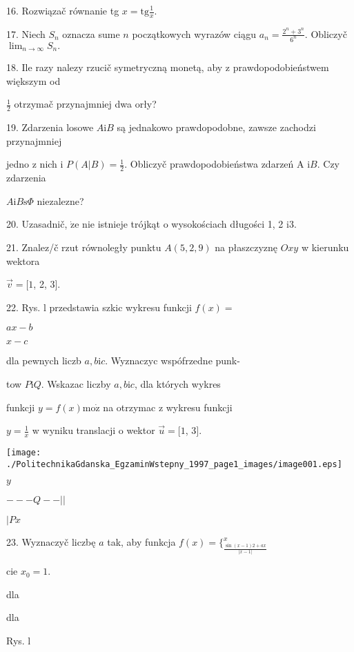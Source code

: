 \documentclass[a4paper,12pt]{article}
\begin{document}
16. Rozwiązač równanie tg $x=\displaystyle \mathrm{t}\mathrm{g}\frac{1}{x}.$

17. Niech $S_{n}$ oznacza sume $n$ początkowych wyrazów ciągu $a_{n}=\displaystyle \frac{2^{n}+3^{n}}{6^{n}}.$ Obliczyč $\displaystyle \lim_{n\rightarrow\infty}S_{n}.$




18. Ile razy nalezy rzucič symetryczną monetą, aby z prawdopodobieństwem większym od

$\displaystyle \frac{1}{2}$ otrzymač przynajmniej dwa orły?

19. Zdarzenia losowe $A\mathrm{i}B$ są jednakowo prawdopodobne, zawsze zachodzi przynajmniej

jedno z nich i $P(A|B)=\displaystyle \frac{1}{2}$. Obliczyč prawdopodobieństwa zdarzeń A $\mathrm{i}B$. Czy zdarzenia

$ A\mathrm{i}B\mathrm{s}\Phi$ niezalezne?

20. Uzasadnič, $\dot{\mathrm{z}}\mathrm{e}$ nie istnieje trójkąt o wysokościach długości 1, 2 $\mathrm{i}3.$

21. Znalez/č rzut równoległy punktu $A(5,2,9)$ na płaszczyznę $Oxy$ w kierunku wektora

$\vec{v}=[1$, 2, 3$].$

22. Rys. l przedstawia szkic wykresu funkcji $f(x)=$

$ax-b$

$x-c$

dla pewnych liczb $a, b\mathrm{i}c$. Wyznaczyc wspófrzedne punk-

tow $P\mathrm{i}Q$. Wskazac liczby $a, b\mathrm{i}c$, dla których wykres

funkcji $y = f(x) \mathrm{m}\mathrm{o}\dot{\mathrm{z}}$ na otrzymac z wykresu funkcji

$y=\displaystyle \frac{1}{x}$ w wyniku translacji o wektor $\vec{u}=[1$, 3$].$
\begin{center}
\texttt{[image: ./PolitechnikaGdanska\_EgzaminWstepny\_1997\_page1\_images/image001.eps]}
\end{center}
$y$

$---Q--||$

$|P x$

23. Wyznaczyč liczbę $a$ tak, aby funkcja $f(x)=\{_{\frac{\sin(x-1)2+ax}{|x-1|}}^{x}$

cie $x_{0}=1.$

dla

dla

Rys. l
\end{document}
